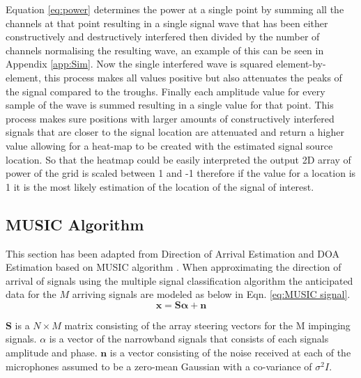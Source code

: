\documentclass{UoNMCHA}
\numberwithin{equation}{section}
\begin{document}
    Equation \ref{eq:power} determines the power at a single point by summing all the channels at that point resulting in a single signal wave that has been either constructively and destructively interfered then divided by the number of channels normalising the resulting wave, an example of this can be seen in Appendix \ref{app:Sim}. Now the single interfered wave is squared element-by-element, this process makes all values positive but also attenuates the peaks of the signal compared to the troughs. Finally each amplitude value for every sample of the wave is summed resulting in a single value for that point. This process makes sure positions with larger amounts of constructively interfered signals that are closer to the signal location are attenuated and return a higher value allowing for a heat-map to be created with the estimated signal source location. So that the heatmap could be easily interpreted the output 2D array of power of the grid is scaled between 1 and -1 therefore if the value for a location is 1 it is the most likely estimation of the location of the signal of interest.
    
\subsection{MUSIC Algorithm} \label{sec:Software MUSIC}
    This section has been adapted from Direction of Arrival Estimation \citep{Adv13} and DOA Estimation based on MUSIC algorithm \citep{Tan14}. When approximating the direction of arrival of signals using the multiple signal classification algorithm the anticipated data for the $M$ arriving signals are modeled as below in Eqn. \ref{eq:MUSIC signal}. 
    \begin{equation}
        \mathbf{x}=\mathbf{S\alpha} + \mathbf{n}
        \label{eq:MUSIC signal}
    \end{equation}

    $\mathbf{S}$ is a $N \times M$ matrix consisting of the array steering vectors for the M impinging signals. $\alpha$ is a vector of the narrowband signals that consists of each signals amplitude and phase. $\mathbf{n}$ is a vector consisting of the noise received at each of the microphones assumed to be a zero-mean Gaussian with a co-variance of $\sigma^2I$.
\end{document}
